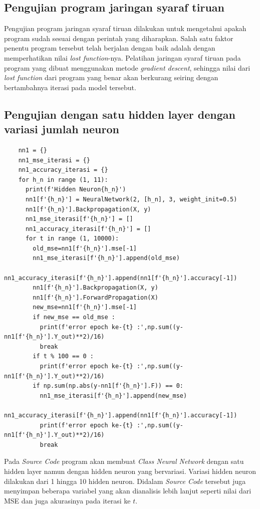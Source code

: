 \subsection{Pengujian program jaringan syaraf tiruan}
Pengujian program jaringan syaraf tiruan dilakukan untuk mengetahui apakah program sudah sesuai dengan perintah yang diharapkan. Salah satu faktor penentu program tersebut telah berjalan dengan baik adalah dengan memperhatikan nilai \textit{lost function}-nya. Pelatihan jaringan syaraf tiruan pada program yang dibuat menggunakan metode \textit{gradient descent}, sehingga nilai dari \textit{lost function} dari program yang benar akan berkurang seiring dengan bertambahnya iterasi pada model tersebut.

\subsection{Pengujian dengan satu hidden layer dengan variasi jumlah neuron}
\begin{lstlisting}
    nn1 = {}
    nn1_mse_iterasi = {}
    nn1_accuracy_iterasi = {}
    for h_n in range (1, 11):
      print(f'Hidden Neuron{h_n}')
      nn1[f'{h_n}'] = NeuralNetwork(2, [h_n], 3, weight_init=0.5)
      nn1[f'{h_n}'].Backpropagation(X, y)
      nn1_mse_iterasi[f'{h_n}'] = []
      nn1_accuracy_iterasi[f'{h_n}'] = []
      for t in range (1, 10000):
        old_mse=nn1[f'{h_n}'].mse[-1]
        nn1_mse_iterasi[f'{h_n}'].append(old_mse)
        nn1_accuracy_iterasi[f'{h_n}'].append(nn1[f'{h_n}'].accuracy[-1])
        nn1[f'{h_n}'].Backpropagation(X, y)
        nn1[f'{h_n}'].ForwardPropagation(X)
        new_mse=nn1[f'{h_n}'].mse[-1]
        if new_mse == old_mse :
          print(f'error epoch ke-{t} :',np.sum((y-nn1[f'{h_n}'].Y_out)**2)/16)
          break
        if t % 100 == 0 :
          print(f'error epoch ke-{t} :',np.sum((y-nn1[f'{h_n}'].Y_out)**2)/16)
        if np.sum(np.abs(y-nn1[f'{h_n}'].F)) == 0:
          nn1_mse_iterasi[f'{h_n}'].append(new_mse)
          nn1_accuracy_iterasi[f'{h_n}'].append(nn1[f'{h_n}'].accuracy[-1])
          print(f'error epoch ke-{t} :',np.sum((y-nn1[f'{h_n}'].Y_out)**2)/16)
          break
\end{lstlisting}

Pada \textit{Source Code} program akan membuat \textit{Class Neural Network} dengan satu hidden layer namun dengan hidden neuron yang bervariasi. Variasi hidden neuron dilakukan dari 1 hingga 10 hidden neuron. Didalam \textit{Source Code} tersebut juga menyimpan beberapa variabel yang akan dianalisis lebih lanjut seperti nilai dari MSE dan juga akurasinya pada iterasi ke $t$.


